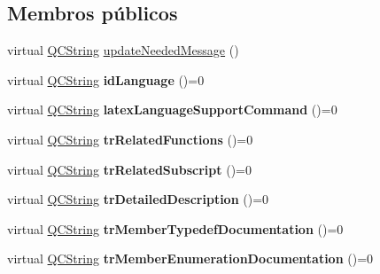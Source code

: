 \subsection*{Membros públicos}
\begin{DoxyCompactItemize}
\item 
virtual \hyperlink{class_q_c_string}{Q\-C\-String} \hyperlink{class_translator_aa2c053398a494e36caf5152d9a4fc6cf}{update\-Needed\-Message} ()
\item 
\hypertarget{class_translator_a59040066dcfd8ce82fd9d8bf11cc32ec}{virtual \hyperlink{class_q_c_string}{Q\-C\-String} {\bfseries id\-Language} ()=0}\label{class_translator_a59040066dcfd8ce82fd9d8bf11cc32ec}

\item 
\hypertarget{class_translator_a6b6d7fa9137a1abf809672a6e0dd9596}{virtual \hyperlink{class_q_c_string}{Q\-C\-String} {\bfseries latex\-Language\-Support\-Command} ()=0}\label{class_translator_a6b6d7fa9137a1abf809672a6e0dd9596}

\item 
\hypertarget{class_translator_af7a311442dabbcc049b0453e6d1b3ee1}{virtual \hyperlink{class_q_c_string}{Q\-C\-String} {\bfseries tr\-Related\-Functions} ()=0}\label{class_translator_af7a311442dabbcc049b0453e6d1b3ee1}

\item 
\hypertarget{class_translator_a7d6bf0dee21142dd2c71b5695c8de3b1}{virtual \hyperlink{class_q_c_string}{Q\-C\-String} {\bfseries tr\-Related\-Subscript} ()=0}\label{class_translator_a7d6bf0dee21142dd2c71b5695c8de3b1}

\item 
\hypertarget{class_translator_a62c9eedd90bdec6a6677053bb7639ca8}{virtual \hyperlink{class_q_c_string}{Q\-C\-String} {\bfseries tr\-Detailed\-Description} ()=0}\label{class_translator_a62c9eedd90bdec6a6677053bb7639ca8}

\item 
\hypertarget{class_translator_a800f0c705dfa247abae366bee73871f6}{virtual \hyperlink{class_q_c_string}{Q\-C\-String} {\bfseries tr\-Member\-Typedef\-Documentation} ()=0}\label{class_translator_a800f0c705dfa247abae366bee73871f6}

\item 
\hypertarget{class_translator_a932bff359236f27796269b5a6e4ed264}{virtual \hyperlink{class_q_c_string}{Q\-C\-String} {\bfseries tr\-Member\-Enumeration\-Documentation} ()=0}\label{class_translator_a932bff359236f27796269b5a6e4ed264}


\end{DoxyCompactItemize}
